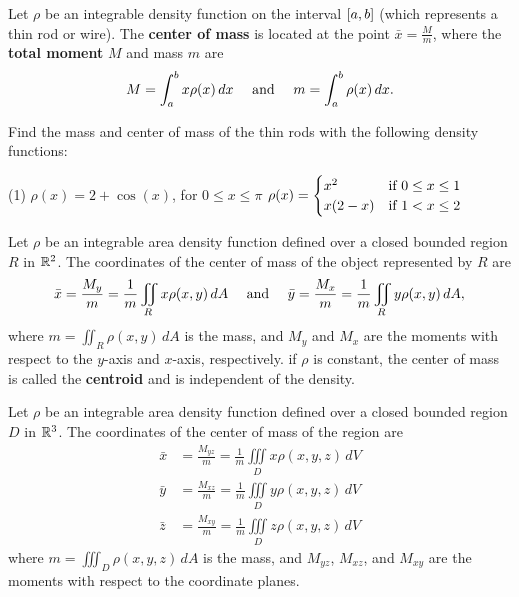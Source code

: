 \documentclass[mathNotesPreamble]{subfiles}
\begin{document}
  \begin{defn*}
    Let $\rho$ be an integrable density function on the interval ${\left[a,b\right]}$ (which represents a thin rod or wire). The \textbf{center of mass} is located at the point $\bar{x}=\frac{M}{m}$, where the \textbf{total moment} $M$ and mass $m$ are
      \[M=\int_a^b x\rho(x)\,dx\quad \textnormal{ and }\quad m=\int_a^b \rho(x)\,dx.\]
  \end{defn*}
  \begin{ex*}
    Find the mass and center of mass of the thin rods with the following density functions:
  \end{ex*}
  \begin{tasks}[after-item-skip=\stretch{1}, label=](1)
    \task 
      $\rho(x)=2+\cos(x)$, for $0\leq x\leq \pi$
    \task 
      $\rho(x)=\begin{cases}
        x^2& \textnormal{if } 0\leq x\leq 1\\
        x(2-x)& \textnormal{if } 1<x\leq 2
      \end{cases}$
  \end{tasks}
  \pagebreak

  \begin{defn*}
    Let $\rho$ be an integrable area density function defined over a closed bounded region $R$ in $\mathbb{R}^2$. The coordinates of the center of mass of the object represented by $R$ are
      \[\bar{x}=\frac{M_y}{m}=\frac{1}{m}\iint\limits_R x\rho(x,y)\,dA\quad \textnormal{ and }\quad \bar{y}=\frac{M_x}{m}=\frac{1}{m}\iint\limits_R y\rho(x,y)\,dA,\]
    where $m=\iint_R \rho(x,y)\,dA$ is the mass, and $M_y$ and $M_x$ are the moments with respect to the $y$-axis and $x$-axis, respectively. if $\rho$ is constant, the center of mass is called the \textbf{centroid} and is independent of the density.
  \end{defn*}

  \pagebreak

  \begin{defn*}
    Let $\rho$ be an integrable area density function defined over a closed bounded region $D$ in $\mathbb{R}^3$. The coordinates of the center of mass of the region are
    \begin{align*}
      \bar{x}&=\frac{M_{yz}}{m}=\frac{1}{m}\iiint\limits_D x\rho(x,y,z)\,dV\\
      \bar{y}&=\frac{M_{xz}}{m}=\frac{1}{m}\iiint\limits_D y\rho(x,y,z)\,dV\\
      \bar{z}&=\frac{M_{xy}}{m}=\frac{1}{m}\iiint\limits_D z\rho(x,y,z)\,dV
    \end{align*}
    where $m=\iiint_D \rho(x,y,z)\,dA$ is the mass, and $M_{yz}$, $M_{xz}$, and $M_{xy}$ are the moments with respect to the coordinate planes.
  \end{defn*}

  \pagebreak
  
\end{document}
